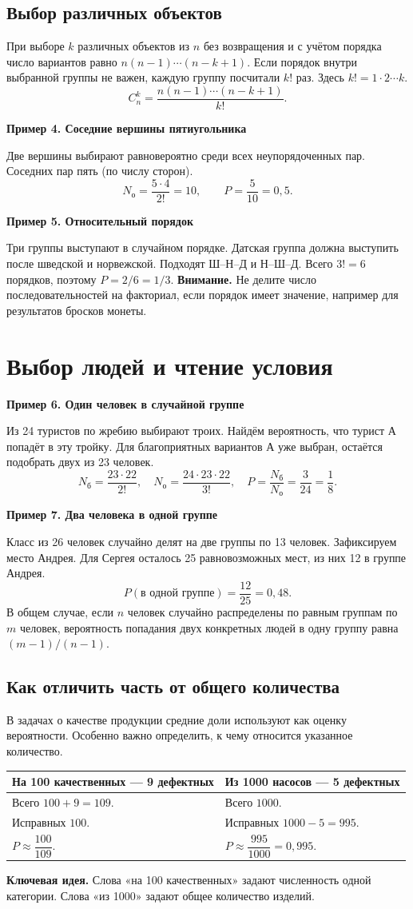 \documentclass[a4paper,12pt]{article}
\newcommand{\idea}[1]{\textcolor{darkaccent}{\textbf{Ключевая идея.}} #1}
\newcommand{\example}[1]{\par\medskip\textcolor{darkaccent}{\textbf{#1}}\par}
\newcommand{\warning}[1]{\textcolor{warn}{\textbf{Внимание.}} #1}
\newcommand{\nb}{N_{\text{б}}}
\newcommand{\Nall}{N_{\text{о}}}
\begin{document}
\subsection*{Выбор различных объектов}
При выборе $k$ различных объектов из $n$ без возвращения и с учётом порядка число вариантов равно $n(n-1)\cdots(n-k+1)$. Если порядок внутри выбранной группы не важен, каждую группу посчитали $k!$ раз. Здесь $k!=1\cdot2\cdots k$.
\[ C_n^k=\frac{n(n-1)\cdots(n-k+1)}{k!}. \]
\example{Пример 4. Соседние вершины пятиугольника}
Две вершины выбирают равновероятно среди всех неупорядоченных пар. Соседних пар пять (по числу сторон).
\[ \Nall=\frac{5\cdot4}{2!}=10,\qquad P=\frac5{10}=0,5. \]
\example{Пример 5. Относительный порядок}
Три группы выступают в случайном порядке. Датская группа должна выступить после шведской и норвежской. Подходят Ш--Н--Д и Н--Ш--Д. Всего $3!=6$ порядков, поэтому $P=2/6=1/3$.
\warning{Не делите число последовательностей на факториал, если порядок имеет значение, например для результатов бросков монеты.}

\clearpage
\section{Выбор людей и чтение условия}
\example{Пример 6. Один человек в случайной группе}
Из 24 туристов по жребию выбирают троих. Найдём вероятность, что турист А попадёт в эту тройку. Для благоприятных вариантов А уже выбран, остаётся подобрать двух из 23 человек.
\[ \nb=\frac{23\cdot22}{2!},\quad \Nall=\frac{24\cdot23\cdot22}{3!},\quad P=\frac{\nb}{\Nall}=\frac3{24}=\frac18. \]
\example{Пример 7. Два человека в одной группе}
Класс из 26 человек случайно делят на две группы по 13 человек. Зафиксируем место Андрея. Для Сергея осталось 25 равновозможных мест, из них 12 в группе Андрея.
\[ P(\text{в одной группе})=\frac{12}{25}=0,48. \]
В общем случае, если $n$ человек случайно распределены по равным группам по $m$ человек, вероятность попадания двух конкретных людей в одну группу равна $(m-1)/(n-1)$.
\subsection*{Как отличить часть от общего количества}
В задачах о качестве продукции средние доли используют как оценку вероятности. Особенно важно определить, к чему относится указанное количество.
\begin{center}
\begin{tabularx}{\linewidth}{@{}X X@{}}
\toprule
\textbf{На 100 качественных --- 9 дефектных} & \textbf{Из 1000 насосов --- 5 дефектных}\\
\midrule
Всего $100+9=109$. & Всего $1000$.\\
Исправных $100$. & Исправных $1000-5=995$.\\
$P\approx\dfrac{100}{109}$. & $P\approx\dfrac{995}{1000}=0,995$.\\
\bottomrule
\end{tabularx}
\end{center}
\idea{Слова «на 100 качественных» задают численность одной категории. Слова «из 1000» задают общее количество изделий.}
\end{document}

